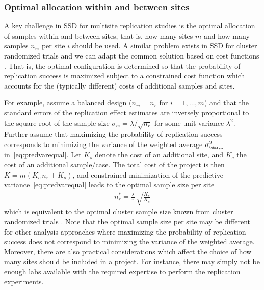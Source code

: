 \subsubsection{Optimal allocation within and between sites}
A key challenge in SSD for multisite replication studies is the optimal
allocation of samples within and between sites, that is, how many sites $m$ and
how many samples $n_{ri}$ per site $i$ should be used. A similar problem exists
in SSD for cluster randomized trials and we can adapt the common solution based
on cost functions \citep{Raudenbush1997}. %
That is, the optimal configuration is determined so that the probability of
replication success is maximized subject to a constrained cost function which
accounts for the (typically different) costs of additional samples and sites.

For example, assume a balanced design ($n_{ri} = n_{r}$ for $i = 1, \dots, m$)
and that the standard errors of the replication effect estimates are inversely
proportional to the square-root of the sample size
$\sigma_{ri} = \lambda/\sqrt{n_{r}}$ for some unit variance $\lambda^{2}$.
Further assume that maximizing the probability of replication success
corresponds to minimizing the variance of the weighted average
$\sigma^{2}_{\scriptscriptstyle \that_{r*}}$ in~\eqref{eq:predvarequal}. %
Let $K_{s}$ denote the cost of an additional site, and $K_{c}$ the cost of an
additional sample/case. The total cost of the project is then
$K = m(K_{c} \, n_{r} + K_{s})$, and constrained minimization of the predictive
variance~\eqref{eq:predvarequal} leads to the optimal sample size per site
\begin{align*}
  n_{r}^{*} =  \frac{\lambda}{\tau} \, \sqrt{\frac{K_{s}}{K_{c}}}
\end{align*}
which is equivalent to the optimal cluster sample size known from cluster
randomized trials \citep{Raudenbush2000}. Note that the optimal sample size per
site may be different for other analysis approaches where maximizing the
probability of replication success does not correspond to minimizing the
variance of the weighted average. %
Moreover, there are also practical considerations which affect the choice of how
many sites should be included in a project. For instance, there may simply not
be enough labs available with the required expertise to perform the replication
experiments.

